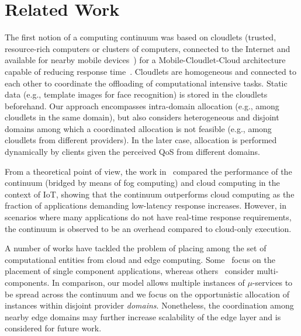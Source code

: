 \section{Related Work}
\label{sec:related}

The first notion of a computing continuum was based on cloudlets (trusted, resource-rich computers or clusters of computers, connected to the Internet and available for nearby mobile devices~\cite{Satyanarayanan09cloudlets}) for a Mobile-Cloudlet-Cloud architecture capable of reducing response time~\cite{Soyata:2012}. Cloudlets are homogeneous and connected to each other to coordinate the offloading of computational intensive tasks. Static data (e.g., template images for face recognition) is stored in the cloudlets beforehand. Our approach encompasses intra-domain allocation (e.g., among cloudlets in the same domain), but also considers heterogeneous and disjoint domains among which a coordinated allocation is not feasible (e.g., among cloudlets from different providers). In the later case, allocation is performed dynamically by clients given the perceived QoS from different domains.

From a theoretical point of view, the work in~\cite{sarkar2015assessment} compared the performance of the continuum (bridged by means of fog computing) and cloud computing in the context of IoT, showing that the continuum outperforms cloud computing as the fraction of applications demanding low-latency response increases. However, in scenarios where many applications do not have real-time response requirements, the continuum is observed to be an overhead compared to cloud-only execution.

A number of works have tackled the problem of placing among the set of computational entities from cloud and edge computing. Some~\cite{Tarneberg2017} focus on the placement of single component applications, whereas others~\cite{Wang:2017} consider multi-components. In comparison, our model allows multiple instances of $\mu$-services to be spread across the continuum and we focus on the opportunistic allocation of instances within disjoint provider \textit{domains}. Nonetheless, the coordination among nearby edge domains may further increase scalability of the edge layer and is considered for future work.

